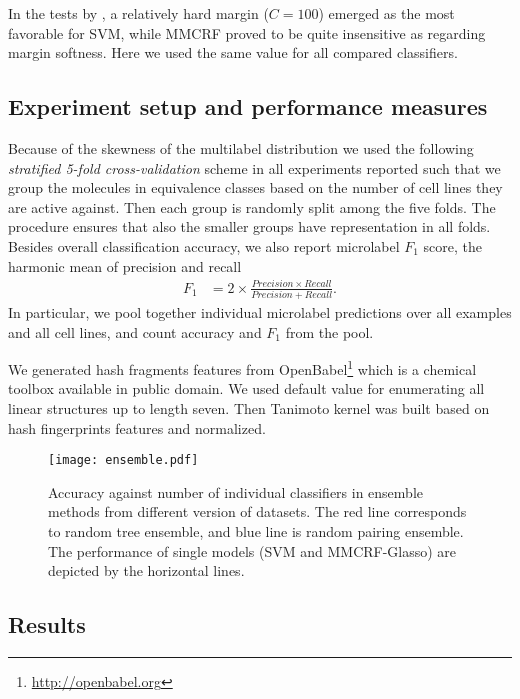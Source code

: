 \documentclass[runningheads,a4paper]{llncs}
\begin{document}
In the tests by \cite{su2010}, a  relatively hard margin ($C = 100$) emerged as the most favorable for SVM, while MMCRF proved to 
be quite insensitive as regarding margin softness. Here we used the same value for all compared  classifiers.

\subsection{Experiment setup and performance measures}

Because of the skewness of the multilabel distribution we used the following {\em stratified 5-fold cross-validation} scheme in all experiments reported such that we group the molecules in equivalence classes based on the number of cell lines they are active against. Then each group is randomly split among the five folds. The procedure ensures that also the smaller groups have representation in all folds. Besides overall classification accuracy, we also report microlabel $F_1$ score, the harmonic mean of precision and recall 
\begin{align*}
	F_1 &= 2 \times \frac{Precision \times Recall}{Precision + Recall}.
\end{align*}
In particular, we pool together individual microlabel predictions over all examples and all cell lines, and count accuracy and $F_1$ from the pool.

We generated hash fragments features from OpenBabel\footnote{\url{http://openbabel.org}} which is a chemical toolbox available in public domain. We used default value for enumerating all linear structures up to length seven. Then Tanimoto kernel was built based on hash fingerprints features and normalized.

\begin{figure}[t]
\begin{center}
\texttt{[image: ensemble.pdf]}
\caption{Accuracy against number of individual classifiers in ensemble methods from different version of datasets. The red line corresponds to random tree ensemble, and blue line is random pairing ensemble. The performance of single models (SVM and MMCRF-Glasso) are depicted by the horizontal lines.}
\label{ensemble}
\end{center}
\end{figure}

\subsection{Results}
\end{document}
